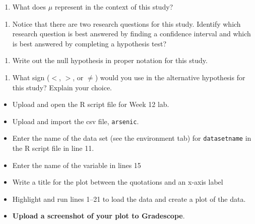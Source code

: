 \documentclass[
]{report}
\providecommand{\tightlist}{%
  \setlength{\itemsep}{0pt}\setlength{\parskip}{0pt}}
\begin{document}
\begin{enumerate}
\def\labelenumi{\arabic{enumi}.}
\tightlist
\item
  What does \(\mu\) represent in the context of this study?
\end{enumerate}

\vspace{0.8in}

\begin{enumerate}
\def\labelenumi{\arabic{enumi}.}
\setcounter{enumi}{1}
\tightlist
\item
  Notice that there are two research questions for this study. Identify which research question is best answered by finding a confidence interval and which is best answered by completing a hypothesis test?
\end{enumerate}

\vspace{0.5in}

\begin{enumerate}
\def\labelenumi{\arabic{enumi}.}
\setcounter{enumi}{2}
\tightlist
\item
  Write out the null hypothesis in proper notation for this study.
\end{enumerate}

\vspace{0.4in}

\begin{enumerate}
\def\labelenumi{\arabic{enumi}.}
\setcounter{enumi}{3}
\tightlist
\item
  What sign (\(<\), \(>\), or \(\neq\)) would you use in the alternative hypothesis for this study? Explain your choice.
\end{enumerate}

\vspace{0.5in}

\begin{itemize}
\item
  Upload and open the R script file for Week 12 lab.
\item
  Upload and import the csv file, \texttt{arsenic}.
\item
  Enter the name of the data set (see the environment tab) for \texttt{datasetname} in the R script file in line 11.
\item
  Enter the name of the variable in lines 15
\item
  Write a title for the plot between the quotations and an x-axis label
\item
  Highlight and run lines 1--21 to load the data and create a plot of the data.
\item
  \textbf{Upload a screenshot of your plot to Gradescope}.
\end{itemize}
\end{document}
